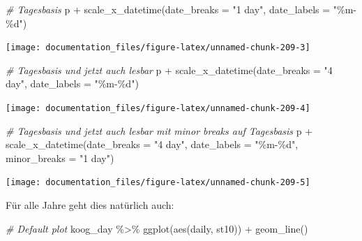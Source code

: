 \documentclass[
]{article}
\newenvironment{Shaded}{\begin{snugshade}}{\end{snugshade}}
\newcommand{\AttributeTok}[1]{\textcolor[rgb]{0.77,0.63,0.00}{#1}}
\newcommand{\CommentTok}[1]{\textcolor[rgb]{0.56,0.35,0.01}{\textit{#1}}}
\newcommand{\FunctionTok}[1]{\textcolor[rgb]{0.00,0.00,0.00}{#1}}
\newcommand{\NormalTok}[1]{#1}
\newcommand{\SpecialCharTok}[1]{\textcolor[rgb]{0.00,0.00,0.00}{#1}}
\newcommand{\StringTok}[1]{\textcolor[rgb]{0.31,0.60,0.02}{#1}}
\begin{document}
\begin{Shaded}
\begin{Highlighting}[]
\CommentTok{\# Tagesbasis}
\NormalTok{p }\SpecialCharTok{+} \FunctionTok{scale\_x\_datetime}\NormalTok{(}\AttributeTok{date\_breaks =} \StringTok{"1 day"}\NormalTok{, }\AttributeTok{date\_labels =} \StringTok{"\%m{-}\%d"}\NormalTok{)}
\end{Highlighting}
\end{Shaded}

\begin{center}\texttt{[image: documentation\_files/figure-latex/unnamed-chunk-209-3]} \end{center}

\begin{Shaded}
\begin{Highlighting}[]
\CommentTok{\# Tagesbasis und jetzt auch lesbar}
\NormalTok{p }\SpecialCharTok{+} \FunctionTok{scale\_x\_datetime}\NormalTok{(}\AttributeTok{date\_breaks =} \StringTok{"4 day"}\NormalTok{, }\AttributeTok{date\_labels =} \StringTok{"\%m{-}\%d"}\NormalTok{)}
\end{Highlighting}
\end{Shaded}

\begin{center}\texttt{[image: documentation\_files/figure-latex/unnamed-chunk-209-4]} \end{center}

\begin{Shaded}
\begin{Highlighting}[]
\CommentTok{\# Tagesbasis und jetzt auch lesbar mit minor breaks auf Tagesbasis}
\NormalTok{p }\SpecialCharTok{+} \FunctionTok{scale\_x\_datetime}\NormalTok{(}\AttributeTok{date\_breaks =} \StringTok{"4 day"}\NormalTok{, }\AttributeTok{date\_labels =} \StringTok{"\%m{-}\%d"}\NormalTok{, }\AttributeTok{minor\_breaks =} \StringTok{"1 day"}\NormalTok{)}
\end{Highlighting}
\end{Shaded}

\begin{center}\texttt{[image: documentation\_files/figure-latex/unnamed-chunk-209-5]} \end{center}

Für alle Jahre geht dies natürlich auch:

\begin{Shaded}
\begin{Highlighting}[]
\CommentTok{\# Default plot}
\NormalTok{koog\_day }\SpecialCharTok{\%\textgreater{}\%}
  \FunctionTok{ggplot}\NormalTok{(}\FunctionTok{aes}\NormalTok{(daily, st10)) }\SpecialCharTok{+}
  \FunctionTok{geom\_line}\NormalTok{()}
\end{Highlighting}
\end{Shaded}
\end{document}
